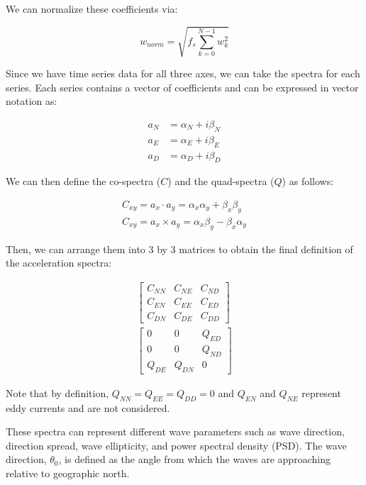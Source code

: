 We can normalize these coefficients via:

\begin{equation}
    w_{norm} = \sqrt{f_s \sum_{k=0}^{N-1}w_k^2}
\end{equation}

Since we have time series data for all three axes, we can take the spectra for each series. 
Each series contains a vector of coefficients and can be expressed in vector notation as:

\begin{align}
    a_N &= \alpha_N + i\beta_N \\
    a_E &= \alpha_E + i\beta_E \\
    a_D &= \alpha_D + i\beta_D
\end{align}

We can then define the co-spectra ($C$) and the quad-spectra ($Q$) as follows:

\begin{gather}
    C_{xy} = a_x \cdot a_y = \alpha_x \alpha_y + \beta_x \beta_y \\
    C_{xy} = a_x \times a_y = \alpha_x \beta_y - \beta_x \alpha_y
\end{gather}

Then, we can arrange them into 3 by 3 matrices to obtain the final definition of the acceleration spectra:

\begin{gather}
    \begin{bmatrix}
        C_{NN} & C_{NE} & C_{ND} \\
        C_{EN} & C_{EE} & C_{ED} \\
        C_{DN} & C_{DE} & C_{DD}
    \end{bmatrix} \\
    \begin{bmatrix}
        0 & 0 & Q_{ED} \\
        0 & 0 & Q_{ND} \\
        Q_{DE} & Q_{DN} & 0
    \end{bmatrix}
\end{gather}

Note that by definition, $Q_{NN}=Q_{EE}=Q_{DD}=0$ and $Q_{EN}$ and $Q_{NE}$ represent eddy currents and are not considered.

These spectra can represent different wave parameters such as wave direction, direction spread, wave ellipticity, and power spectral density (PSD). 
The wave direction, $\theta_0$, is defined as the angle from which the waves are approaching relative to geographic north.

